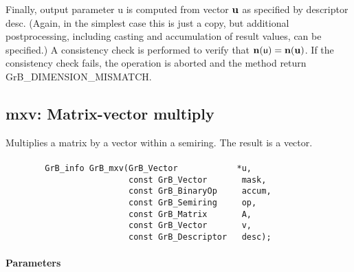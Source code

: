Finally, output parameter {\sf u} is computed from vector ${\bf u}$
as specified by descriptor {\sf desc}. (Again, in the simplest case this
is just a copy, but additional postprocessing, including casting and
accumulation of result values, can be specified.)  A consistency check is
performed to verify that $\bold{n}({\sf u}) = \bold{n}({\bf u})$. If
the consistency check fails, the operation is aborted and the method
return {\sf GrB\_DIMENSION\_MISMATCH}.

 


\subsection{{\sf mxv}: Matrix-vector multiply}

Multiplies a matrix by a vector within a semiring. The result is a vector.

\paragraph{\syntax}

\begin{verbatim}
        GrB_info GrB_mxv(GrB_Vector            *u,
                         const GrB_Vector       mask,
                         const GrB_BinaryOp     accum,
                         const GrB_Semiring     op, 
                         const GrB_Matrix       A,
                         const GrB_Vector       v,
                         const GrB_Descriptor   desc);
\end{verbatim}

\paragraph{Parameters}

